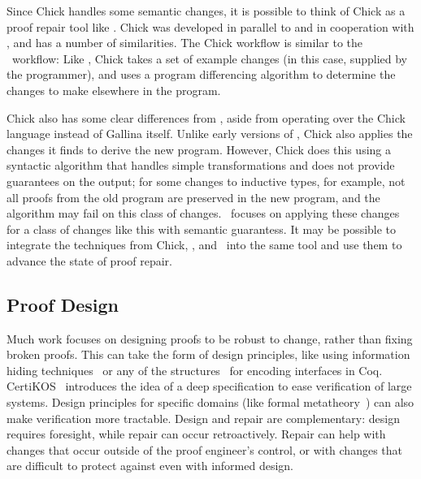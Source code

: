 Since Chick handles some semantic changes, it is possible to think of Chick as a proof repair tool like \sysname.
Chick was developed in parallel to and in cooperation with \sysname, and has a number of similarities.
The Chick workflow is similar to the \sysname\ workflow:
Like \sysname, Chick takes a set of example changes (in this case, supplied by the programmer),
and uses a program differencing algorithm to determine the changes to make elsewhere in the program.

Chick also has some clear differences from \sysname, aside from operating over the Chick language instead of Gallina itself.
Unlike early versions of \sysname, Chick also applies the changes it finds to derive the new program.
However, Chick does this using a syntactic algorithm that handles simple transformations and does
not provide guarantees on the output; for some changes to inductive types, for example, not all proofs from
the old program are preserved in the new program, and the algorithm may fail %
on this class of changes. \devoid\ focuses on applying these changes for a class of changes like this
with semantic guarantess. %
It may be possible to integrate the techniques from Chick, \sysname, and \devoid\
into the same tool and use them to advance the state of proof repair.
\fi

\subsection*{Proof Design}


Much work focuses on designing proofs
to be robust to change, rather than fixing broken proofs.
This can take the form of design principles, like using 
information hiding techniques~\cite{Woos:2016:PCF:2854065.2854081, Klein:2014:CFV:2584468.2560537}
or any of the structures~\cite{Chrzaszcz2003, Sozeau2008, Saibi:PhD} for encoding interfaces in Coq.
CertiKOS~\cite{certikos} introduces the idea of a deep specification to ease verification of large systems.
Design principles for specific domains (like formal metatheory~\cite{Aydemir2008, Delaware2013POPL, Delaware2013ICFP})
can also make verification more tractable.
Design and repair are complementary: design requires foresight, while repair can occur retroactively.
Repair can help with changes that occur outside of the proof engineer's control,
or with changes that are difficult to protect against even with informed design.


